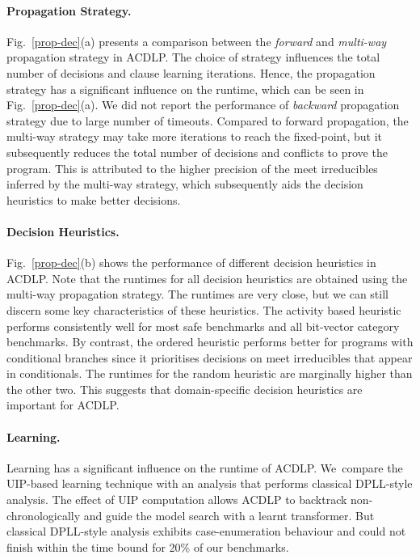 \paragraph{Propagation Strategy.}
%
Fig.~\ref{prop-dec}(a) presents a comparison between the {\em forward} 
and {\em multi-way} propagation strategy in ACDLP.  The
choice of strategy influences the total number of decisions and clause 
learning iterations.  Hence, the propagation strategy has a
significant influence on the runtime, which can be seen in
Fig.~\ref{prop-dec}(a).  We did not report the performance 
of {\em backward} propagation strategy due to large 
number of timeouts.  Compared to forward propagation, the multi-way
strategy may take more iterations to reach the fixed-point, but it
subsequently reduces the total number of decisions and conflicts to prove the
program.  This is attributed to the higher precision of the meet irreducibles 
inferred by the multi-way strategy, which subsequently aids the decision 
heuristics to make better decisions.  

\paragraph{Decision Heuristics.}
%
Fig.~\ref{prop-dec}(b) shows the performance of different decision
heuristics in ACDLP.  Note that the runtimes for all decision heuristics are
obtained using the multi-way propagation strategy.  The runtimes are very
close, but we can still discern some key characteristics of these
heuristics.  The activity based heuristic performs consistently well for most safe
benchmarks and all bit-vector category benchmarks.  By contrast, the ordered
heuristic performs better for programs with conditional branches since it
prioritises decisions on meet irreducibles that appear in conditionals.  The
runtimes for the random heuristic are marginally higher than the other
two.  This suggests that domain-specific decision heuristics are important
for ACDLP.
%

\paragraph{Learning.}
%
Learning has a significant influence on the runtime of ACDLP.  We~compare
the UIP-based learning technique with an analysis that performs classical 
DPLL-style analysis.
The effect of UIP computation allows ACDLP to backtrack non-chronologically 
and guide the model search with a learnt transformer.  But classical 
DPLL-style analysis exhibits case-enumeration behaviour and could not finish 
within the time bound for 20\% of our benchmarks.
%
